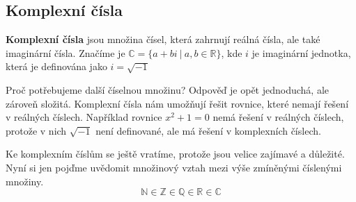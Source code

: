 \subsection{Komplexní čísla}
\begin{definitionbox}
  \textbf{Komplexní čísla} jsou množina čísel, která zahrnují reálná čísla, ale také imaginární čísla. Značíme je $\mathbb{C} = \{a + bi\ |\ a, b\in\mathbb{R}\}$, kde $i$ je imaginární jednotka, která je definována jako $i = \sqrt{-1}$
\end{definitionbox}

Proč potřebujeme další číselnou množinu? Odpověď je opět jednoduchá, ale zároveň složitá. Komplexní čísla nám umožňují řešit rovnice, které nemají řešení v reálných číslech. Například rovnice $x^2 + 1 = 0$ nemá řešení v reálných číslech, protože v nich $\sqrt{-1}$ není definované, ale má řešení v komplexních číslech.

Ke komplexním číslům se ještě vratíme, protože jsou velice zajímavé a důležité. Nyní si jen pojďme uvědomit množinový vztah mezi výše zmíněnými číslenými množiny.
\begin{equation}
  \mathbb{N} \in \mathbb{Z} \in \mathbb{Q} \in \mathbb{R} \in \mathbb{C}
\end{equation}
